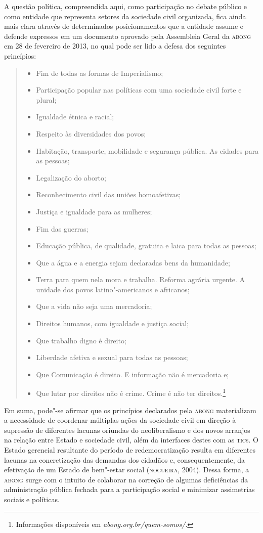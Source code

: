 A questão política, compreendida aqui, como participação no debate
público e como entidade que representa setores da sociedade civil
organizada, fica ainda mais clara através de determinados
posicionamentos que a entidade assume e defende expressos em um
documento aprovado pela Assembleia Geral da \textsc{abong} em 28 de fevereiro de
2013, no qual pode ser lido a defesa dos seguintes princípios:

\begin{quote}
\begin{itemize}
\item Fim de todas as formas de Imperialismo; 
\item Participação popular nas políticas com uma sociedade civil forte e plural; 
\item Igualdade étnica e racial; 
\item Respeito às diversidades dos povos; 
\item Habitação, transporte, mobilidade e segurança pública. As cidades para as pessoas;
\item Legalização do aborto; 
\item Reconhecimento civil das uniões homoafetivas;
\item Justiça e igualdade para as mulheres; 
\item Fim das guerras; 
\item Educação pública, de qualidade, gratuita e laica para todas as pessoas;
\item Que a água e a energia sejam declaradas bens da humanidade;
\item Terra para quem nela mora e trabalha. Reforma agrária urgente. A unidade dos povos latino"-americanos e africanos;
\item Que a vida não seja uma mercadoria; 
\item Direitos humanos, com igualdade e justiça social; 
\item Que trabalho digno é direito; 
\item Liberdade afetiva e sexual para todas as pessoas; 
\item Que Comunicação é direito. E informação não é mercadoria e; 
\item Que lutar por direitos não é crime. Crime é não ter direitos.\footnote{Informações
  disponíveis em \textit{abong.org.br/quem-somos/}.}
\end{itemize}
\end{quote}

Em suma, pode"-se afirmar que os princípios declarados pela \textsc{abong}
materializam a necessidade de coordenar múltiplas ações da sociedade
civil em direção à supressão de diferentes lacunas oriundas do
neoliberalismo e dos novos arranjos na relação entre Estado e sociedade
civil, além da interfaces destes com as \textsc{tic}s. O Estado gerencial
resultante do período de redemocratização resulta em diferentes lacunas
na concretização das demandas dos cidadãos e, consequentemente, da
efetivação de um Estado de bem"-estar social (\textsc{nogueira}, 2004). Dessa
forma, a \textsc{abong} surge com o intuito de colaborar na correção de algumas
deficiências da administração pública fechada para a participação social
e minimizar assimetrias sociais e políticas.

